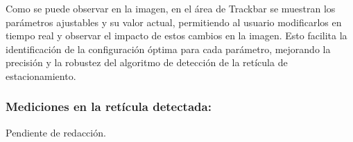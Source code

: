 \noindent
Como se puede observar en la imagen, en el área de Trackbar se muestran los parámetros ajustables y su valor actual,
permitiendo al usuario modificarlos en tiempo real y observar el impacto de estos cambios en la imagen.
Esto facilita la identificación de la configuración óptima para cada parámetro, mejorando la precisión
y la robustez del algoritmo de detección de la retícula de estacionamiento.

\subsubsection{Mediciones en la retícula detectada:}
Pendiente de redacción.
